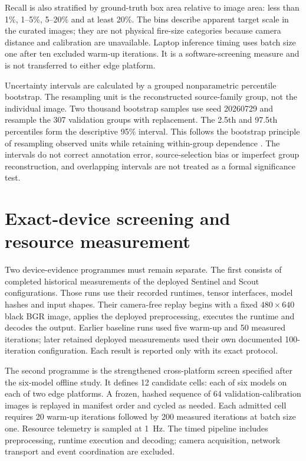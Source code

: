 Recall is also stratified by ground-truth box area relative to image area:
less than 1\%, 1--5\%, 5--20\% and at least 20\%. The bins describe apparent
target scale in the curated images; they are not physical fire-size categories
because camera distance and calibration are unavailable. Laptop inference
timing uses batch size one after ten excluded warm-up iterations. It is a
software-screening measure and is not transferred to either edge platform.

Uncertainty intervals are calculated by a grouped nonparametric percentile
bootstrap. The resampling unit is the reconstructed source-family group, not
the individual image. Two thousand bootstrap samples use seed 20260729 and
resample the 307 validation groups with replacement. The 2.5th and 97.5th
percentiles form the descriptive 95\% interval. This follows the bootstrap
principle of resampling observed units \cite{Efron1979Bootstrap} while retaining
within-group dependence \cite{Harden2011ClusterBootstrap}. The intervals do
not correct annotation error, source-selection bias or imperfect group
reconstruction, and overlapping intervals are not treated as a formal
significance test.

\section{Exact-device screening and resource measurement}
\label{sec:methodology:3}

Two device-evidence programmes must remain separate. The first consists of
completed historical measurements of the deployed Sentinel and Scout
configurations. Those runs use their recorded runtimes, tensor interfaces,
model hashes and input shapes. Their camera-free replay begins with a fixed
\(480\times640\) black BGR image, applies the deployed preprocessing, executes
the runtime and decodes the output. Earlier baseline runs used five warm-up
and 50 measured iterations; later retained deployed measurements used their
own documented 100-iteration configuration. Each result is reported only with
its exact protocol.

The second programme is the strengthened cross-platform screen specified after
the six-model offline study. It defines 12 candidate cells: each of six models
on each of two edge platforms. A frozen, hashed sequence of 64
validation-calibration images is replayed in manifest order and cycled as
needed. Each admitted cell requires 20 warm-up iterations followed by 200
measured iterations at batch size one. Resource telemetry is sampled at 1~Hz.
The timed pipeline includes preprocessing, runtime execution and decoding;
camera acquisition, network transport and event coordination are excluded.

